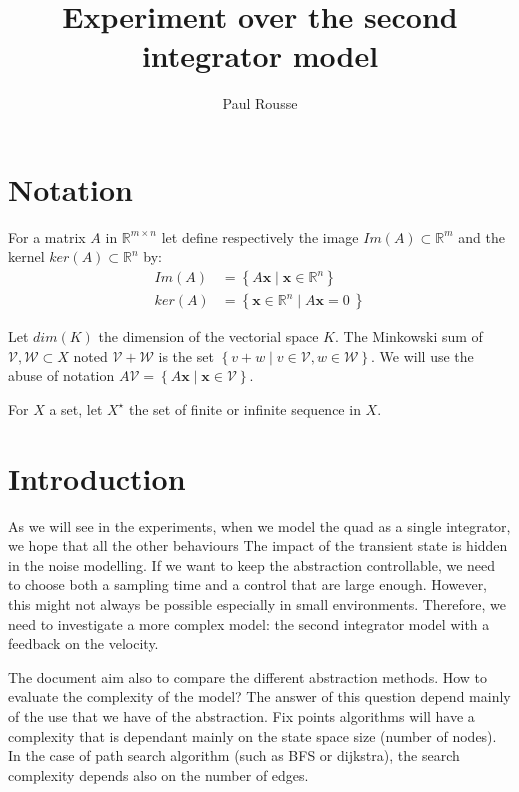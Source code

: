 \documentclass{article}
\theoremstyle{named}
\begin{document}
\title{Experiment over the second integrator model}
\author{Paul Rousse}

\maketitle

\section{Notation}

For a matrix $A$ in $\mathbb{R}^{m \times n}$ let define respectively the image $Im(A) \subset \mathbb{R}^m$ and the kernel $ker(A) \subset \mathbb{R}^n$ by:
\begin{align*}
Im(A) &= \left \{ A \mathbf{x} \mid \mathbf{x}  \in \mathbb{R}^n \right \} \\ 
ker(A) &= \left \{ \mathbf{x} \in \mathbb{R}^n \mid A \mathbf{x} = 0\ \right \} 
\end{align*}

Let $dim(K)$ the dimension of the vectorial space $K$.
The Minkowski sum of $\mathcal{V},\mathcal{W} \subset X$ noted $\mathcal{V}+\mathcal{W}$ is the set $\left \{v+w \mid v \in \mathcal{V}, w\in \mathcal{W} \right \}$. We will use the abuse of notation $A  \mathcal{V} = \left \{ A \mathbf{x} \mid \mathbf{x}  \in \mathcal{V} \right \}$.

For $X$ a set, let $X^\star$ the set of finite or infinite sequence in $X$.

\section{Introduction}
As we will see in the experiments, when we model the quad as a single integrator, we hope that all the other behaviours 
The impact of the transient state is hidden in the noise modelling.
If we want to keep the abstraction controllable, we need to choose both a sampling time and a control that are large enough. However, this might not always be possible especially in small environments.
Therefore, we need to investigate a more complex model: the second integrator model with a feedback on the velocity.

The document aim also to compare the different abstraction methods.
How to evaluate the complexity of the model?
The answer of this question depend mainly of the use that we have of the abstraction. Fix points algorithms will have a complexity that is dependant mainly on the state space size (number of nodes).
In the case of path search algorithm (such as BFS or dijkstra), the search complexity depends also on the number of edges.
\end{document}
